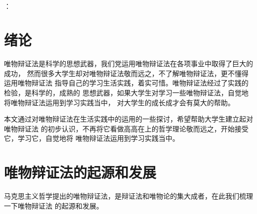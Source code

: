 \documentclass{article}
\begin{document}
\begin{center}%
\section*{}
\end{center}%
\hspace{8mm}

~\\
~\\
：\\%

\newpage

\songti%
\setlength{\baselineskip}{20pt}

    \section{绪论}
    唯物辩证法是科学的思想武器，我们党运用唯物辩证法在各项事业中取得了巨大的成功，
    然而很多大学生却对唯物辩证法敬而远之，不了解唯物辩证法，更不懂得运用唯物辩证法
    指导自己的学习生活实践，着实可惜。唯物辩证法经过了实践的检验，是科学的，成熟的
    思想武器，如果大学生对学习一些唯物辩证法，自觉地将唯物辩证法运用到学习实践当中，
    对大学生的成长成才会有莫大的帮助。\par
    本文通过对唯物辩证法在生活实践中的运用的一些探讨，希望帮助大学生建立起对唯物辩证法
    的初步认识，不再将它看做高高在上的哲学理论敬而远之，开始接受它，学习它，自觉地将
    唯物辩证法运用到学习实践当中。\par


\section{唯物辩证法的起源和发展}

    马克思主义哲学提出的唯物辩证法，是辩证法和唯物论的集大成者，在此我们梳理一下唯物辩证法
的起源和发展。\par
\end{document}
